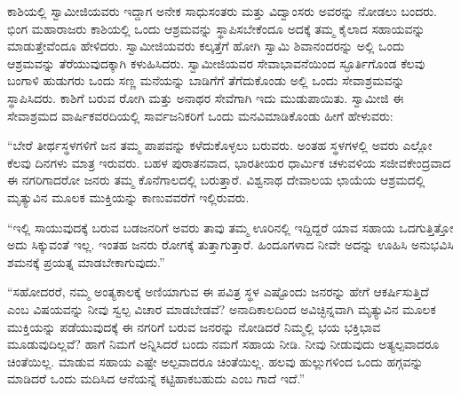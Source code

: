  ಕಾಶಿಯಲ್ಲಿ ಸ್ವಾಮೀಜಿಯವರು ಇದ್ದಾಗ ಅನೇಕ ಸಾಧುಸಂತರು ಮತ್ತು ವಿದ್ವಾಂಸರು ಅವರನ್ನು ನೋಡಲು ಬಂದರು. ಭಿಂಗ ಮಹಾರಾಜರು ಕಾಶಿಯಲ್ಲಿ ಒಂದು ಆಶ್ರಮವನ್ನು ಸ್ಥಾಪಿಸಬೇಕೆಂದೂ ಅದಕ್ಕೆ ತಮ್ಮ ಕೈಲಾದ ಸಹಾಯವನ್ನು ಮಾಡುತ್ತೇವೆಂದೂ ಹೇಳಿದರು. ಸ್ವಾಮೀಜಿಯವರು ಕಲ್ಕತ್ತೆಗೆ ಹೋಗಿ ಸ್ವಾಮಿ ಶಿವಾನಂದರನ್ನು ಅಲ್ಲಿ ಒಂದು ಆಶ್ರಮವನ್ನು ತೆರೆಯುವುದಕ್ಕಾಗಿ ಕಳುಹಿಸಿದರು. ಸ್ವಾಮೀಜಿಯವರ ಸೇವಾಭಾವನೆಯಿಂದ ಸ್ಫೂರ್ತಿಗೊಂಡ ಕೆಲವು ಬಂಗಾಳಿ ಹುಡುಗರು ಒಂದು ಸಣ್ಣ ಮನೆಯನ್ನು ಬಾಡಿಗೆಗೆ ತೆಗೆದುಕೊಂಡು ಅಲ್ಲಿ ಒಂದು ಸೇವಾಶ್ರಮವನ್ನು ಸ್ಥಾಪಿಸಿದರು. ಕಾಶಿಗೆ ಬರುವ ರೋಗಿ ಮತ್ತು ಅನಾಥರ ಸೇವೆಗಾಗಿ ಇದು ಮುಡುಪಾಯಿತು. ಸ್ವಾಮೀಜಿ ಈ ಸೇವಾಶ್ರಮದ ವಾರ್ಷಿಕವರದಿಯಲ್ಲಿ ಸಾರ್ವಜನಿಕರಿಗೆ ಒಂದು ಮನವಿಮಾಡಿಕೊಂಡು ಹೀಗೆ ಹೇಳುವರು: 

 “ಬೇರೆ ತೀರ್ಥಸ್ಥಳಗಳಿಗೆ ಜನ ತಮ್ಮ ಪಾಪವನ್ನು ಕಳೆದುಕೊಳ್ಳಲು ಬರುವರು. ಅಂತಹ ಸ್ಥಳಗಳಲ್ಲಿ ಅವರು ಎಲ್ಲೋ ಕೆಲವು ದಿನಗಳು ಮಾತ್ರ ಇರುವರು. ಬಹಳ ಪುರಾತನವಾದ, ಭಾರತೀಯರ ಧಾರ್ಮಿಕ ಚಳುವಳಿಯ ಸಜೀವಕೇಂದ್ರವಾದ ಈ ನಗರಿಗಾದರೋ ಜನರು ತಮ್ಮ ಕೊನೆಗಾಲದಲ್ಲಿ ಬರುತ್ತಾರೆ. ವಿಶ್ವನಾಥ ದೇವಾಲಯ ಛಾಯೆಯ ಆಶ್ರಮದಲ್ಲಿ ಮೃತ್ಯುವಿನ ಮೂಲಕ ಮುಕ್ತಿಯನ್ನು ಕಾಣುವವರೆಗೆ ಇಲ್ಲಿರುವರು. 

 “ಇಲ್ಲಿ ಸಾಯುವುದಕ್ಕೆ ಬರುವ ಬಡಜನರಿಗೆ ಅವರು ತಾವು ತಮ್ಮ ಊರಿನಲ್ಲಿ ಇದ್ದಿದ್ದರೆ ಯಾವ ಸಹಾಯ ಒದಗುತ್ತಿತ್ತೋ ಅದು ಸಿಕ್ಕುವಂತೆ ಇಲ್ಲ. ಇಂತಹ ಜನರು ರೋಗಕ್ಕೆ ತುತ್ತಾಗುತ್ತಾರೆ. ಹಿಂದೂಗಳಾದ ನೀವೇ ಅದನ್ನು ಊಹಿಸಿ ಅನುಭವಿಸಿ ಶಮನಕ್ಕೆ ಪ್ರಯತ್ನ ಮಾಡಬೇಕಾಗುವುದು.” 

 “ಸಹೋದರರೆ, ನಮ್ಮ ಅಂತ್ಯಕಾಲಕ್ಕೆ ಅಣಿಯಾಗುವ ಈ ಪವಿತ್ರ ಸ್ಥಳ ಎಷ್ಟೊಂದು ಜನರನ್ನು ಹೇಗೆ ಆಕರ್ಷಿಸುತ್ತಿದೆ ಎಂಬ ವಿಷಯವನ್ನು ನೀವು ಸ್ವಲ್ಪ ವಿಚಾರ ಮಾಡಬೇಡವೆ? ಅನಾದಿಕಾಲದಿಂದ ಅವಿಚ್ಛಿನ್ನವಾಗಿ ಮೃತ್ಯುವಿನ ಮೂಲಕ ಮುಕ್ತಿಯನ್ನು ಪಡೆಯುವುದಕ್ಕೆ ಈ ನಗರಿಗೆ ಬರುವ ಜನರನ್ನು ನೋಡಿದರೆ ನಿಮ್ಮಲ್ಲಿ ಭಯ ಭಕ್ತಿಭಾವ ಮೂಡುವುದಿಲ್ಲವೆ? ಹಾಗೆ ನಿಮಗೆ ಅನ್ನಿಸಿದರೆ ಬಂದು ನಮಗೆ ಸಹಾಯ ನೀಡಿ. ನೀವು ನೀಡುವುದು ಅತ್ಯಲ್ಪವಾದರೂ ಚಿಂತೆಯಿಲ್ಲ. ಮಾಡುವ ಸಹಾಯ ಎಷ್ಟೇ ಅಲ್ಪವಾದರೂ ಚಿಂತೆಯಿಲ್ಲ. ಹಲವು ಹುಲ್ಲುಗಳಿಂದ ಒಂದು ಹಗ್ಗವನ್ನು ಮಾಡಿದರೆ ಒಂದು ಮದಿಸಿದ ಆನೆಯನ್ನೆ ಕಟ್ಟಿಹಾಕಬಹುದು ಎಂಬ ಗಾದೆ ಇದೆ.” 

